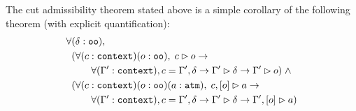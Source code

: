 The cut admissibility theorem stated above is a simple corollary of
the following theorem (with explicit quantification):
\begin{align*}
\forall & (\delta : \sltm{oo}), \\
& (\forall (c : \sltm{context}) (o : \sltm{oo}), \; \seqsl[c]{o} \rightarrow \\
& \qquad \forall (\inddyncon{} : \sltm{context}), c = \inddyncon{}, \delta \rightarrow \seqsl[\inddyncon{}]{\delta} \rightarrow \seqsl[\inddyncon{}]{o}) \; \wedge \\
& (\forall (c : \sltm{context}) (o : \sltm{oo}) (a : \hybridtm{atm}), \; \bchsl[c]{o}{a} \rightarrow \\
& \qquad \forall (\inddyncon : \sltm{context}), c = \inddyncon{}, \delta \rightarrow \seqsl[\inddyncon{}]{\delta} \rightarrow \bchsl[\inddyncon{}]{o}{a})
\end{align*}


